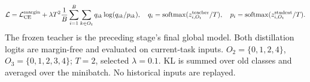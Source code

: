 \[\mathcal L=\mathcal L_{\rm CE}^{\rm margin}+\lambda T^2\frac1B\sum_{i=1}^B\sum_{k\in O_t}q_{ik}\log(q_{ik}/p_{ik}),\quad q_i=\operatorname{softmax}(z^{\rm teacher}_{i,O_t}/T),\quad p_i=\operatorname{softmax}(z^{\rm student}_{i,O_t}/T).\]
The frozen teacher is the preceding stage's final global model. Both distillation logits are margin-free and evaluated on current-task inputs. $O_2=\{0,1,2,4\}$, $O_3=\{0,1,2,3,4\}$; $T=2$, selected $\lambda=0.1$. KL is summed over old classes and averaged over the minibatch. No historical inputs are replayed.
